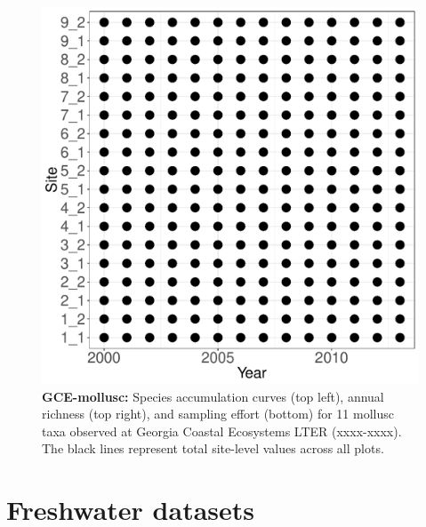\documentclass[11pt, oneside]{article}
\begin{document}
\begin{figure}[h!]
\includegraphics[scale = 0.4]{gce-mollusc-compagnoni_spatiotemporal_sampling_effort.pdf}
\caption{{\bf GCE-mollusc:} Species accumulation curves (top left),  annual richness (top right), and sampling effort (bottom)  for 11 mollusc taxa observed at Georgia Coastal Ecosystems LTER (xxxx-xxxx). The black lines represent total site-level values across all plots.}
\label{gce-mollusc}
\end{figure}



\section {Freshwater datasets}
\end{document}
